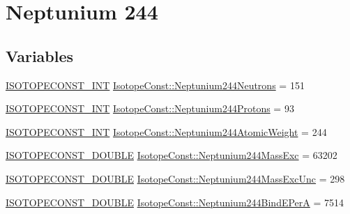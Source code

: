 \hypertarget{group___isotope_const-_neptunium-_np244}{}\section{Neptunium 244}
\label{group___isotope_const-_neptunium-_np244}
\subsection*{Variables}
\begin{DoxyCompactItemize}
\item 
\mbox{\hyperlink{group___isotope_const-_macros_ga5f18360b3e99483a35c32d789e62621c}{I\+S\+O\+T\+O\+P\+E\+C\+O\+N\+S\+T\+\_\+\+I\+NT}} \mbox{\hyperlink{group___isotope_const-_neptunium-_np244_gab2c276f0272c09db884b7ce8b5f31158}{Isotope\+Const\+::\+Neptunium244\+Neutrons}} = 151
\item 
\mbox{\hyperlink{group___isotope_const-_macros_ga5f18360b3e99483a35c32d789e62621c}{I\+S\+O\+T\+O\+P\+E\+C\+O\+N\+S\+T\+\_\+\+I\+NT}} \mbox{\hyperlink{group___isotope_const-_neptunium-_np244_gad0dfb94904f471a2473237795dfbe7ae}{Isotope\+Const\+::\+Neptunium244\+Protons}} = 93
\item 
\mbox{\hyperlink{group___isotope_const-_macros_ga5f18360b3e99483a35c32d789e62621c}{I\+S\+O\+T\+O\+P\+E\+C\+O\+N\+S\+T\+\_\+\+I\+NT}} \mbox{\hyperlink{group___isotope_const-_neptunium-_np244_ga9bf68157326c5bf4b1248ad65ede12f3}{Isotope\+Const\+::\+Neptunium244\+Atomic\+Weight}} = 244
\item 
\mbox{\hyperlink{group___isotope_const-_macros_ga8f45a7272ce02c0b4c65c44636ed719a}{I\+S\+O\+T\+O\+P\+E\+C\+O\+N\+S\+T\+\_\+\+D\+O\+U\+B\+LE}} \mbox{\hyperlink{group___isotope_const-_neptunium-_np244_ga85831bd0d10517ed3c6dda74c0a9414d}{Isotope\+Const\+::\+Neptunium244\+Mass\+Exc}} = 63202
\item 
\mbox{\hyperlink{group___isotope_const-_macros_ga8f45a7272ce02c0b4c65c44636ed719a}{I\+S\+O\+T\+O\+P\+E\+C\+O\+N\+S\+T\+\_\+\+D\+O\+U\+B\+LE}} \mbox{\hyperlink{group___isotope_const-_neptunium-_np244_gab3a8332a85fe60bad7b2f499d1e9bafa}{Isotope\+Const\+::\+Neptunium244\+Mass\+Exc\+Unc}} = 298
\item 
\mbox{\hyperlink{group___isotope_const-_macros_ga8f45a7272ce02c0b4c65c44636ed719a}{I\+S\+O\+T\+O\+P\+E\+C\+O\+N\+S\+T\+\_\+\+D\+O\+U\+B\+LE}} \mbox{\hyperlink{group___isotope_const-_neptunium-_np244_ga23b00bd0808583aceea1edcf14c34fad}{Isotope\+Const\+::\+Neptunium244\+Bind\+E\+PerA}} = 7514
\item 

\end{DoxyCompactItemize}
